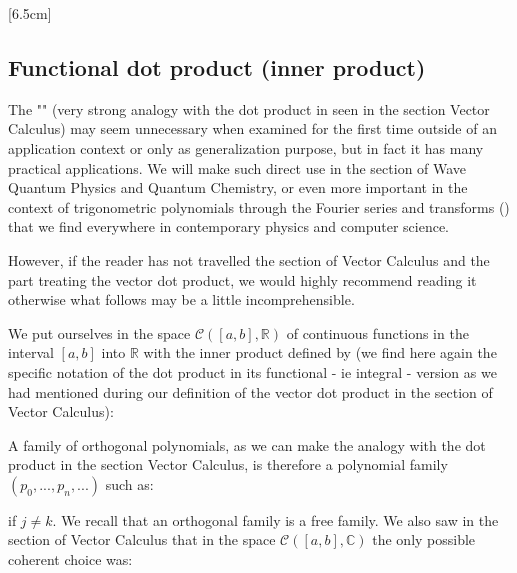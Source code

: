 	[6.5cm]
	
	\pagebreak
	\subsection{Functional dot product (inner product)}\label{functional dot product}
	The "" (very strong analogy with the dot product in seen in the section Vector Calculus) may seem unnecessary when examined for the first time outside of an application context or only as generalization purpose, but in fact it has many practical applications. We will make such direct use in the section of Wave Quantum Physics and Quantum Chemistry, or even more important in the context of trigonometric polynomials through the Fourier series and transforms () that we find everywhere in contemporary physics and computer science.
	
	However, if the reader has not travelled the section of Vector Calculus and the part treating the vector dot product, we would highly recommend reading it otherwise what follows may be a little incomprehensible.
	
	We put ourselves in the space $\mathcal{C}([a,b],\mathbb{R})$ of continuous functions in the interval $[a, b]$ into $\mathbb{R}$ with the inner product defined by (we find here again the specific notation of the dot product in its functional - ie integral - version as we had mentioned during our definition of the vector dot product in the section of Vector Calculus):
	
	
	A family of orthogonal polynomials, as we can make the analogy with the dot product in the section Vector Calculus, is therefore a polynomial family $(p_0,...,p_n,...)$ such as:
	
	if $j \ne k$. We recall that an orthogonal family is a free family. We also saw in the section of Vector Calculus that in the space $\mathcal{C}([a,b],\mathbb{C})$ the only possible coherent choice was:
	
